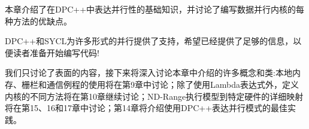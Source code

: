 本章介绍了在DPC++中表达并行性的基础知识，并讨论了编写数据并行内核的每种方法的优缺点。\par

DPC++和SYCL为许多形式的并行提供了支持，希望已经提供了足够的信息，以便读者准备开始编写代码!\par

我们只讨论了表面的内容，接下来将深入讨论本章中介绍的许多概念和类:本地内存、栅栏和通信例程的使用将在第9章中讨论；除了使用Lambda表达式外，定义内核的不同方法将在第10章继续讨论；ND-Range执行模型到特定硬件的详细映射将在第15、16和17章中讨论；第14章将介绍使用DPC++表达并行模式的最佳实践。\par

\newpage